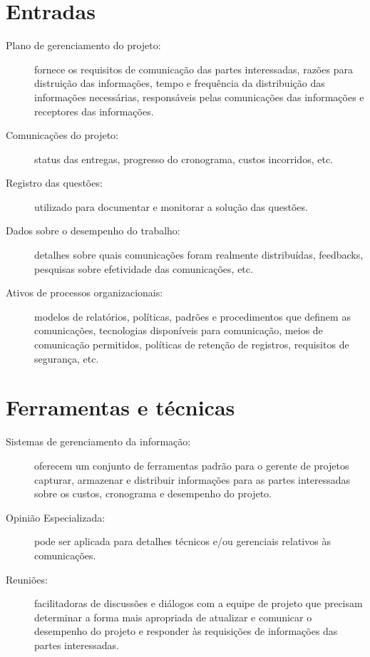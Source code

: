 \section{Entradas}

\begin{description}

	\item[Plano de gerenciamento do projeto:] fornece os requisitos de comunicação das partes interessadas, razões para distruição das informações, tempo e frequência da distribuição das informações necessárias, responsáveis pelas comunicações das informações e receptores das informações.
	
	\item[Comunicações do projeto:] status das entregas, progresso do cronograma, custos incorridos, etc.
	
	\item[Registro das questões:] utilizado para documentar e monitorar a solução das questões.
	
	\item[Dados sobre o desempenho do trabalho:] detalhes sobre quais comunicações foram realmente distribuídas, feedbacks, pesquisas sobre efetividade das comunicações, etc.
	
	\item[Ativos de processos organizacionais:] modelos de relatórios, políticas, padrões e procedimentos que definem as comunicações, tecnologias disponíveis para comunicação, meios de comunicação permitidos, políticas de retenção de registros, requisitos de segurança, etc.
	
	
\end{description}

\section{Ferramentas e técnicas}

\begin{description}
	
	\item[Sistemas de gerenciamento da informação:] oferecem um conjunto de ferramentas padrão para o gerente de projetos capturar, armazenar e distribuir informações para as partes interessadas sobre os custos, cronograma e desempenho do projeto.
	
	\item[Opinião Especializada:] pode ser aplicada para detalhes técnicos e/ou gerenciais relativos às comunicações.
	
	\item[Reuniões:] facilitadoras de discussões e diálogos com a equipe de projeto que precisam determinar a forma mais apropriada de atualizar e comunicar o desempenho do projeto e responder às requisições de informações das partes interessadas.
	

\end{description}

